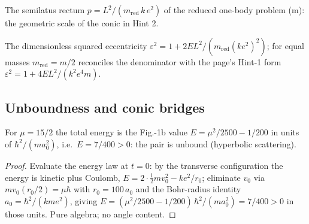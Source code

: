 \begin{definition}
\label{def:IPhO2026Problems_problem_IPhO_2026_1_B_2:semilatusRectum}
The semilatus rectum $p = L^2/(m_{\mathrm{red}}\,k\,e^2)$ of the reduced
one-body problem (m): the geometric scale of the conic in Hint 2.
\end{definition}

\begin{definition}
\label{def:IPhO2026Problems_problem_IPhO_2026_1_B_2:eccentricitySq}
The dimensionless squared eccentricity
$\varepsilon^2 = 1 + 2 E L^2/(m_{\mathrm{red}} (k e^2)^2)$; for equal
masses $m_{\mathrm{red}} = m/2$ reconciles the denominator with the page's
Hint-1 form $\varepsilon^2 = 1 + 4 E L^2/(k^2 e^4 m)$.
\end{definition}

\subsection*{Unboundness and conic bridges}

\begin{theorem}
\label{thm:IPhO2026Problems_problem_IPhO_2026_1_B_2:total_energy_pos}
For $\mu = 15/2$ the total energy is the Fig.-1b value
$E = \mu^2/2500 - 1/200$ in units of $\hbar^2/(m a_0^2)$, i.e.\
$E = 7/400 > 0$: the pair is unbound (hyperbolic scattering).
\end{theorem}
\begin{proof}
Evaluate the energy law at $t = 0$: by the transverse configuration the
energy is kinetic plus Coulomb,
$E = 2\cdot\tfrac12 m v_0^2 - k e^2/r_0$; eliminate $v_0$ via
$m v_0 (r_0/2) = \mu\hbar$ with $r_0 = 100\,a_0$ and the Bohr-radius identity
$a_0 = \hbar^2/(k m e^2)$, giving
$E = (\mu^2/2500 - 1/200)\,\hbar^2/(m a_0^2) = 7/400 > 0$ in those units.
Pure algebra; no angle content.
\end{proof}

